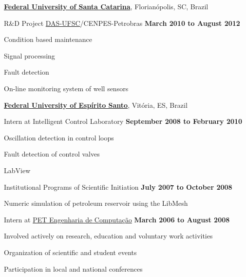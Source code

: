 \documentclass[10pt]{article}
\renewcommand\textit[1]{#1}
\newcommand{\halfblankline}{\quad\vspace{-0.5\baselineskip}\pagebreak[3]}
\begin{document}
\href{http://www.ufsc.br}{\textbf{Federal University of Santa Catarina}},
Florianópolis, SC, Brazil
\begin{outerlist}
    
\item[] \textit{R\&D Project \href{http://www.das.ufsc.br}{DAS-UFSC}/CENPES-Petrobras}
    \hfill \textbf{March 2010 to August 2012}
    \begin{innerlist}
    \item Condition based maintenance
    \item Signal processing
    \item Fault detection
    \item On-line monitoring system of well sensors
    \end{innerlist}
\end{outerlist}
\halfblankline

\href{http://www.ufes.br}{\textbf{Federal University of Espírito Santo}},
Vitória, ES, Brazil
\begin{outerlist}
    
\item[] Intern at Intelligent Control Laboratory
    \hfill \textbf{September 2008 to February 2010}
    \begin{innerlist}
    \item Oscillation detection in control loops
    \item Fault detection of control valves
    \item LabView
    \end{innerlist}

\item[] Institutional Programs of Scientific Initiation
    \hfill \textbf{July 2007 to October 2008}
    \begin{innerlist}
    \item Numeric simulation of petroleum reservoir using the LibMesh
    \end{innerlist}

\item[] Intern at \href{http://www.ufes.br/~pet}{PET Engenharia de Computação}
    \hfill \textbf{March 2006 to August 2008}
    \begin{innerlist}
    \item Involved actively on research, education and voluntary work activities
    \item Organization of scientific and student events
    \item Participation in local and national conferences
    \end{innerlist}

\end{outerlist}
\end{document}
